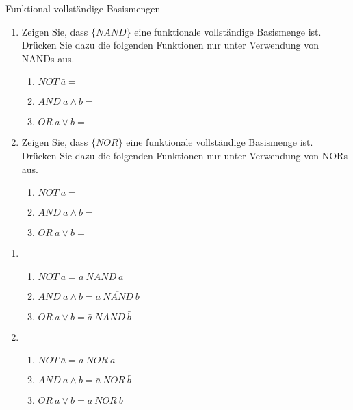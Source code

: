 \documentclass{article}
\begin{document}
\begin{exercise}{Funktional vollständige Basismengen}
  \begin{enumerate}
    \item Zeigen Sie, dass $\{NAND\}$ eine funktionale vollständige Basismenge ist. Drücken Sie dazu die folgenden Funktionen nur unter Verwendung von NANDs aus.
          \begin{enumerate}
            \item $NOT\ \bar{a} = $
            \item $AND\ a \land b = $
            \item $OR\ a \lor b = $
          \end{enumerate}
    \item Zeigen Sie, dass $\{NOR\}$ eine funktionale vollständige Basismenge ist. Drücken Sie dazu die folgenden Funktionen nur unter Verwendung von NORs aus.
          \begin{enumerate}
            \item $NOT\ \bar{a} = $
            \item $AND\ a \land b = $
            \item $OR\ a \lor b = $
          \end{enumerate}
  \end{enumerate}
\end{exercise}

\begin{solution}
  \begin{enumerate}
    \item
          \begin{enumerate}
            \item $NOT\ \bar{a} = a\ NAND\ a$
            \item $AND\ a \land b = \overline{a\ NAND\ b}$
            \item $OR\ a \lor b = \bar{a}\ NAND\ \bar{b}$
          \end{enumerate}
    \item
          \begin{enumerate}
            \item $NOT\ \bar{a} = a\ NOR\ a$
            \item $AND\ a \land b = \bar{a}\ NOR\ \bar{b}$
            \item $OR\ a \lor b = \overline{a\ NOR\ b}$
          \end{enumerate}
  \end{enumerate}
\end{solution}
\end{document}
